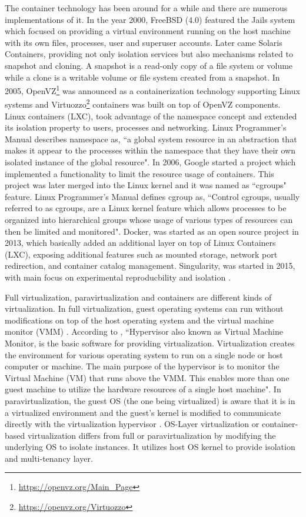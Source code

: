 The container technology has been around for a while and there are numerous implementations of it. In the year 2000, FreeBSD (4.0) featured the Jails system which focused on providing a virtual environment running on the host machine with its own files, processes, user and superuser accounts. Later came Solaris Containers, providing not only isolation services but also mechanisms related to snapshot and cloning. A snapshot is a read-only copy of a file system or volume while a clone is a writable volume or file system created from a snapshot. In 2005, OpenVZ\footnote{\url{https://openvz.org/Main_Page}} was announced as a containerization technology supporting Linux systems and Virtuozzo\footnote{\url{https://openvz.org/Virtuozzo}} containers was built on top of OpenVZ components. Linux containers (LXC), took advantage of the namespace concept and extended its isolation property to users, processes and networking. Linux Programmer's Manual \cite{namespaces} describes namespace as, ``a global system resource in an abstraction that makes it appear to the processes within the namespace that they have their own isolated instance of the global resource". In 2006, Google started a project which implemented a functionality to limit the resource usage of containers. This project was later merged into the Linux kernel and it was named as ``cgroups" feature. Linux Programmer's Manual \cite{cgroups} defines cgroup as, ``Control cgroups, usually referred to as cgroups, are a Linux kernel feature which allows processes to be organized into hierarchical groups whose usage of various types of resources can then be limited and monitored". Docker, was started as an open source project in 2013, which basically added an additional layer on top of Linux Containers (LXC), exposing additional features such as mounted storage, network port redirection, and container catalog management. Singularity, was started in 2015, with main focus on experimental reproducbility and isolation \cite{Xavier:2013:PEC:2497369.2497577}.

Full virtualization, paravirtualization and containers are different kinds of virtualization. In full virtualization, guest operating systems can run without modifications on top of the host operating system and the virtual machine monitor (VMM) \cite{7382987}. According to \cite{hypervisor}, ``Hypervisor also known as Virtual Machine Monitor, is the basic software for providing virtualization. Virtualization creates the environment for various operating system to run on a single node or host computer or machine. The main purpose of the hypervisor is to monitor the Virtual Machine (VM) that runs above the VMM. This enables more than one guest machine to utilize the hardware resources of a single host machine". In paravirtualization, the guest OS (the one being virtualized) is aware that it is in a virtualized environment and the guest's kernel is modified to communicate directly with the virtualization hypervisor \cite{7382987}. OS-Layer virtualization or container-based virtualization differs from full or paravirtualization by modifying the underlying OS to isolate instances. It utilizes host OS kernel to provide isolation and multi-tenancy layer.

